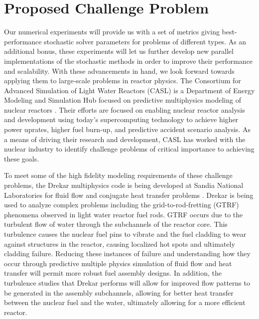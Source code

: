 \section{Proposed Challenge Problem}
\label{sec:challenge_problem}
Our numerical experiments will provide us with a set of metrics giving
best-performance stochastic solver parameters for problems of
different types. As an additional bonus, these experiments will let us
further develop new parallel implementations of the stochastic methods
in order to improve their performance and scalability. With these
advancements in hand, we look forward towards applying them to
large-scale problems in reactor physics. The Consortium for Advanced
Simulation of Light Water Reactors (CASL) is a Department of Energy
Modeling and Simulation Hub focused on predictive multiphysics
modeling of nuclear reactors
\citep{u.s._department_of_energy_casl_2011}. Their efforts are focused
on enabling nuclear reactor analysis and development using today's
supercomputing technology to achieve higher power uprates, higher fuel
burn-up, and predictive accident scenario analysis. As a means of
driving their research and development, CASL has worked with the
nuclear industry to identify challenge problems of critical importance
to achieving these goals.

To meet some of the high fidelity modeling requirements of these
challenge problems, the Drekar multiphysics code is being developed at
Sandia National Laboratories for fluid flow and conjugate heat
transfer problems \citep{pawlowski_drekar_2012}. Drekar is being
used to analyze complex problems including the grid-to-rod-fretting
(GTRF) phenomena observed in light water reactor fuel rods. GTRF
occurs due to the turbulent flow of water through the subchannels of
the reactor core. This turbulence causes the nuclear fuel pins to
vibrate and the fuel cladding to wear against structures in the
reactor, causing localized hot spots and ultimately cladding
failure. Reducing these instances of failure and understanding how
they occur through predictive multiple physics simulation of fluid
flow and heat transfer will permit more robust fuel assembly
designs. In addition, the turbulence studies that Drekar performs will
allow for improved flow patterns to be generated in the assembly
subchannels, allowing for better heat transfer between the nuclear
fuel and the water, ultimately allowing for a more efficient reactor.

